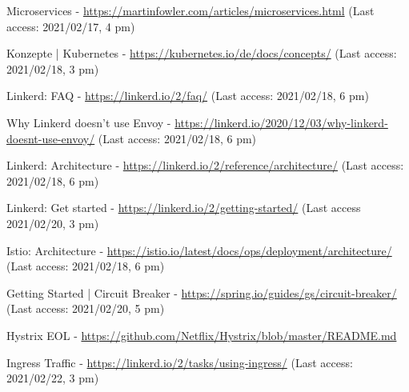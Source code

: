 \begin{thebibliography}{00}
 Microservices - \url{https://martinfowler.com/articles/microservices.html} (Last access: 2021/02/17, 4 pm)

 Konzepte | Kubernetes - \url{https://kubernetes.io/de/docs/concepts/} (Last access: 2021/02/18, 3 pm)

 Linkerd: FAQ - \url{https://linkerd.io/2/faq/} (Last access: 2021/02/18, 6 pm)

 Why Linkerd doesn't use Envoy - \url{https://linkerd.io/2020/12/03/why-linkerd-doesnt-use-envoy/} (Last access: 2021/02/18, 6 pm)

 Linkerd: Architecture - \url{https://linkerd.io/2/reference/architecture/} (Last access: 2021/02/18, 6 pm)

 Linkerd: Get started - \url{https://linkerd.io/2/getting-started/} (Last access 2021/02/20, 3 pm)

 Istio: Architecture - \url{https://istio.io/latest/docs/ops/deployment/architecture/} (Last access: 2021/02/18, 6 pm)

 Getting Started | Circuit Breaker - \url{https://spring.io/guides/gs/circuit-breaker/} (Last access: 2021/02/20, 5 pm)

 Hystrix EOL - \url{https://github.com/Netflix/Hystrix/blob/master/README.md}

 Ingress Traffic - \url{https://linkerd.io/2/tasks/using-ingress/} (Last access: 2021/02/22, 3 pm)


\end{thebibliography}